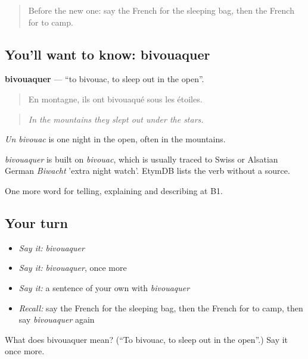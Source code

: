 \label{lesson:FR-C425-bivouaquer}



\begin{quote}
Before the new one: say the French for the sleeping bag, then the French for to camp.
\end{quote}

\subsection*{You'll want to know: bivouaquer}
\textbf{bivouaquer} — \textquotedblleft{}to bivouac, to sleep out in the open\textquotedblright{}.

\begin{quote}
En montagne, ils ont bivouaqué sous les étoiles.
\end{quote}

\begin{quote}
\emph{In the mountains they slept out under the stars.}
\end{quote}

\emph{Un bivouac} is one night in the open, often in the mountains.

\begin{cousinweb}
\emph{bivouaquer} is built on \emph{bivouac}, which is usually traced to Swiss or Alsatian German \emph{Biwacht} 'extra night watch'. EtymDB lists the verb without a source.
\end{cousinweb}

\begin{grammarlens}[title={What you've built}]
One more word for telling, explaining and describing at B1.
\end{grammarlens}

\subsection*{Your turn}
\begin{itemize}
\raggedright
  \item \emph{Say it:} \emph{bivouaquer}
  \item \emph{Say it:} \emph{bivouaquer}, once more
  \item \emph{Say it:} a sentence of your own with \emph{bivouaquer}
  \item \emph{Recall:} say the French for the sleeping bag, then the French for to camp, then say \emph{bivouaquer} again
\end{itemize}

\begin{tcolorbox}[breakable,colback=teal!4,colframe=teal!35!black,title={Before you move on}]
What does bivouaquer mean? (\textquotedblleft{}To bivouac, to sleep out in the open\textquotedblright{}.) Say it once more.
\end{tcolorbox}
